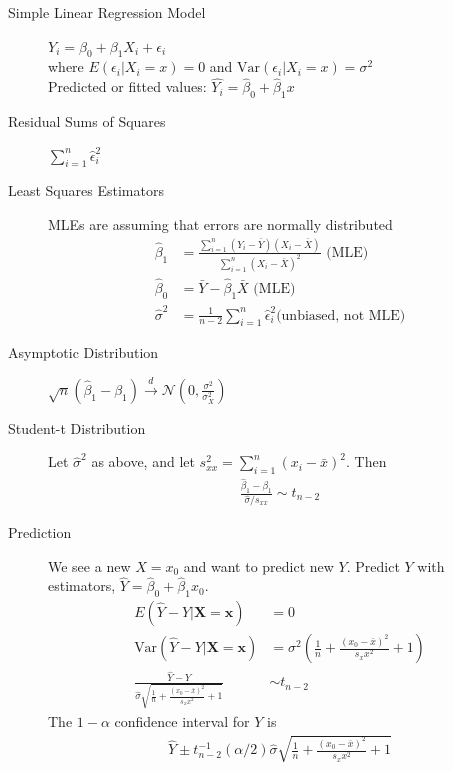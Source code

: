 \documentclass[10pt,landscape]{article}
\newcommand{\var}{\textrm{Var}}
\newcommand{\N}{\mathcal{N}}
\renewcommand\vec{\mathbf}
\begin{document}
\begin{multicols*}{3}
\begin{description}
\item[Simple Linear Regression Model] $Y_i = \beta_0 + \beta_1 X_i + \epsilon_i$ \\
where $E(\epsilon_i | X_i = x) = 0$ and $\var(\epsilon_i | X_i = x) = \sigma^2$ \\
Predicted or fitted values: $\hat{Y_i} = \hat\beta_0 + \hat\beta_1 x$

\item[Residual Sums of Squares] $\sum_{i = 1}^n \hat\epsilon_i^2$ 

\item[Least Squares Estimators] MLEs are assuming that errors are normally distributed
\begin{align*}
    \hat\beta_1 &= \frac{\sum_{i = 1}^n (Y_i - \bar{Y})(X_i - \bar{X})}{\sum_{i = 1}^n (X_i - \bar{X})^2} \text{ (MLE)}\\
    \hat\beta_0 &= \bar{Y} - \hat\beta_1\bar{X} \text{ (MLE)}\\
    \hat\sigma^2 &= \frac{1}{n - 2} \sum_{i = 1}^n \hat\epsilon_i^2 \text{(unbiased, not MLE)}
\end{align*} 

\item[Asymptotic Distribution] $\sqrt{n}(\hat\beta_1 - \beta_1) \stackrel{d}{\to} \N\left(0, \frac{\sigma^2}{\sigma^2_X}\right)$

\item[Student-t Distribution] Let $\hat\sigma^2$ as above, and let $s_{xx}^2 = \sum_{i = 1}^n (x_i - \bar{x})^2$. Then
\begin{align*}
    \frac{\hat\beta_1 - \beta_1}{\hat\sigma/s_{xx}} \sim t_{n - 2}
\end{align*} 

\item[Prediction] We see a new $X = x_0$ and want to predict new $Y$. Predict $Y$ with estimators, $\hat{Y} = \hat\beta_0 + \hat\beta_1 x_0$.
\begin{align*}
    E(\hat{Y} - Y | \vec{X} = \vec{x}) &= 0 \\ 
    \var(\hat{Y} - Y | \vec{X} = \vec{x}) &= \sigma^2 \left(\frac{1}{n} + \frac{(x_0 - \bar{x})^2}{s_xx^2} + 1 \right) \\ 
    \frac{\hat{Y} - Y}{\hat\sigma \sqrt{\frac{1}{n} + \frac{(x_0 - \bar{x})^2}{s_xx^2} + 1}} &\sim t_{n - 2}
\end{align*} 
The $1 - \alpha$ confidence interval for $Y$ is
\begin{align*}
    \hat{Y} \pm t^{-1}_{n - 2}(\alpha / 2) \hat\sigma \sqrt{\frac{1}{n} + \frac{(x_0 - \bar{x})^2}{s_xx^2} + 1}
\end{align*}
\end{description}


\end{multicols*}
\end{document}

